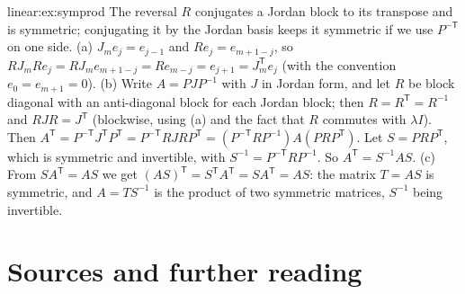 \begin{solution}{linear:ex:symprod}
\idea The reversal $R$ conjugates a Jordan block to its transpose and is symmetric; conjugating it by the Jordan basis
keeps it symmetric if we use $P^{-\mathsf T}$ on one side.
\writeup (a) $J_me_j=e_{j-1}$ and $Re_j=e_{m+1-j}$, so $RJ_mRe_j=RJ_me_{m+1-j}=Re_{m-j}=e_{j+1}=J_m^{\mathsf T}e_j$ (with the
convention $e_0=e_{m+1}=0$). (b) Write $A=PJP^{-1}$ with $J$ in Jordan form, and let $R$ be block diagonal with an
anti-diagonal block for each Jordan block; then $R=R^{\mathsf T}=R^{-1}$ and $RJR=J^{\mathsf T}$ (blockwise, using (a) and the fact
that $R$ commutes with $\lambda I$). Then
$A^{\mathsf T}=P^{-\mathsf T}J^{\mathsf T}P^{\mathsf T}=P^{-\mathsf T}RJRP^{\mathsf T}=(P^{-\mathsf T}RP^{-1})A(PRP^{\mathsf T})$. Let
$S=PRP^{\mathsf T}$, which is symmetric and invertible, with $S^{-1}=P^{-\mathsf T}RP^{-1}$. So $A^{\mathsf T}=S^{-1}AS$. (c) From
$SA^{\mathsf T}=AS$ we get $(AS)^{\mathsf T}=S^{\mathsf T}A^{\mathsf T}=SA^{\mathsf T}=AS$: the matrix $T=AS$ is symmetric, and $A=TS^{-1}$ is the
product of two symmetric matrices, $S^{-1}$ being invertible.
\end{solution}

\section*{Sources and further reading}

